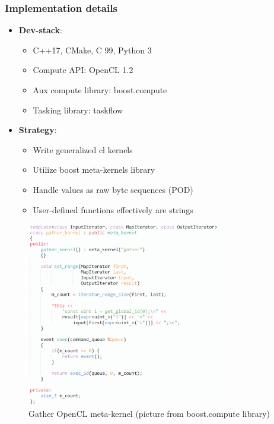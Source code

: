 \documentclass[aspectratio=169,xcolor=table,english]{beamer}
\begin{document}
\begin{frame}[fragile] \frametitle{Implementation details}
    \begin{minipage}[m]{0.55\linewidth}
        \begin{itemize}
            \item \textbf{Dev-stack}: 
            { 
            \begin{itemize}
                \item C++17, CMake, C 99, Python 3
                \item Compute API: OpenCL 1.2\footnotemark[1]
                \item Aux compute library: boost.compute\footnotemark[2]
                \item Tasking library: taskflow\footnotemark[3]
            \end{itemize} 
            }
            \item \textbf{Strategy}: 
            {
            \begin{itemize}
                \item Write generalized cl kernels
                \item Utilize boost meta-kernels library
                \item Handle values as raw byte sequences (POD)
                \item User-defined functions effectively are strings
            \end{itemize}
            }
        \end{itemize}
    \end{minipage}\hfill
    \begin{minipage}[m]{0.45\linewidth}
        \begin{figure}
            \centering
            \includegraphics[width=0.75\textwidth]{figures/meta_programming.png}
            \caption{Gather OpenCL meta-kernel (picture from boost.compute library)}
            \label{fig:meta_programming}
        \end{figure}
    \end{minipage}
    

\end{frame}
\end{document}
